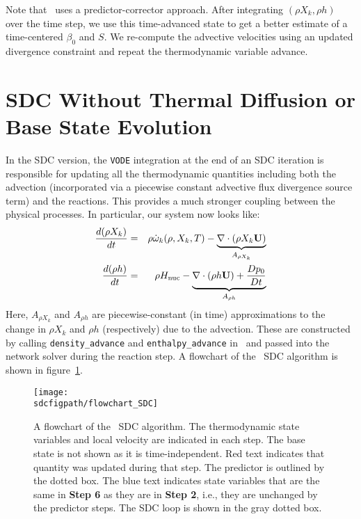 Note that \maestro\ uses a predictor-corrector approach.  After integrating $(\rho X_k,\rho h)$ over
the time step, we use this time-advanced state to get a better estimate of a time-centered $\beta_0$
and $S$.  We re-compute the advective velocities using an updated divergence constraint and repeat 
the thermodynamic variable advance.

\section{SDC Without Thermal Diffusion or Base State Evolution}
In the SDC version, the {\tt VODE} integration at the end of an SDC
iteration is responsible for updating all the thermodynamic quantities
including both the advection (incorporated via a piecewise constant advective 
flux divergence source term) and the reactions.  This provides a much stronger coupling between
the physical processes.  In particular, our system now looks like:
\begin{eqnarray}
\frac{d(\rho X_k)}{dt} &=& \rho \dot{\omega}_k(\rho,X_k,T) - \underbrace{\nabla\cdot(\rho X_k{\bf U})}_{A_{\rho X_k}}\label{eq:sdc:rhoX} \\
\frac{d(\rho h)}{dt}   &=& \rho {H_{\rm nuc}} - \underbrace{\nabla\cdot(\rho h{\bf U}) + \frac{Dp_0}{Dt}}_{A_{\rho h}} \label{eq:sdc:rhoh}
\end{eqnarray}
Here, $A_{\rho X_k}$ and $A_{\rho h}$ are piecewise-constant (in time)
approximations to the change in ${\rho X_k}$ and ${\rho h}$ (respectively)
due to the advection.  These are constructed by calling {\tt density\_advance}
and {\tt enthalpy\_advance} in \maestro\ and passed into the network solver
during the reaction step.  A flowchart of the \maestro\ SDC algorithm is 
shown in figure~\ref{fig:sdc:flowchart}.

\begin{figure}[tb]
\centering
\texttt{[image: \\sdcfigpath/flowchart\_SDC]}
\caption[Graphical flowchart of \maestro\ SDC]
  {\label{fig:sdc:flowchart} A flowchart of the \maestro\ SDC algorithm.  The
  thermodynamic state variables and local velocity are
  indicated in each step.  The base state is not shown as it is time-independent.
  Red text indicates that quantity was
  updated during that step.  The predictor is 
  outlined by the dotted box.  The blue text indicates state
  variables that are the same in {\bf Step 6} as they are in
  {\bf Step 2}, i.e., they are unchanged by the predictor steps.
  The SDC loop is shown in the gray dotted box.}
\end{figure}


